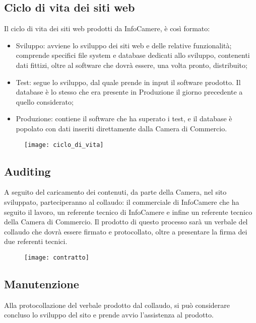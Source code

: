 	\subsection{Ciclo di vita dei siti web}
	
	Il ciclo di vita dei siti web prodotti da InfoCamere, è così formato: 
	\begin{itemize}
		\item {Sviluppo: avviene lo sviluppo dei siti web e delle relative funzionalità; comprende specifici file system e database dedicati allo sviluppo, contenenti dati fittizi, oltre al software che dovrà essere, una volta pronto, distribuito;}
		\item {Test: segue lo sviluppo, dal quale prende in input il software prodotto. Il database è lo stesso che era presente in Produzione il giorno precedente a quello considerato;}
		\item{Produzione: contiene il software che ha superato i test, e il database è popolato con dati inseriti direttamente dalla Camera di Commercio.}
	\end{itemize}

	\begin{figure}[htbp]
		\begin{center}
			\texttt{[image: ciclo\_di\_vita]}
		\end{center}
	\end{figure}
	
	\subsection{Auditing}
	A seguito del caricamento dei contenuti, da parte della Camera, nel sito sviluppato, parteciperanno al collaudo: il commerciale di InfoCamere che ha seguito il lavoro, un referente tecnico di InfoCamere e infine un referente tecnico della Camera di Commercio. Il prodotto di questo processo sarà un verbale del collaudo che dovrà essere firmato e protocollato, oltre a presentare la firma dei due referenti tecnici.
	
	\begin{figure}[htbp]
		\begin{center}
			\texttt{[image: contratto]}
		\end{center}
	\end{figure}

	\subsection{Manutenzione}
	Alla protocollazione del verbale prodotto dal collaudo, si può considerare concluso lo sviluppo del sito e prende avvio l'assistenza al prodotto.
